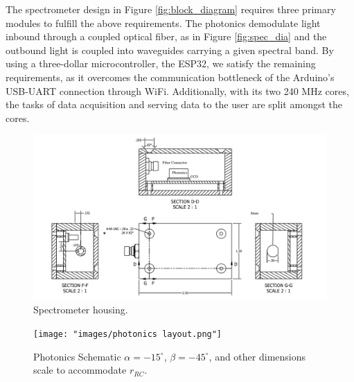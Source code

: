 \documentclass{article}
\begin{document}
      The spectrometer design in Figure \ref{fig:block_diagram} requires three primary modules to fulfill the above requirements. The photonics demodulate light inbound through a coupled optical fiber, as in Figure \ref{fig:spec_dia} and the outbound light is coupled into waveguides carrying a given spectral band. By using a three-dollar microcontroller, the ESP32, we satisfy the remaining requirements, as it overcomes the communication bottleneck of the Arduino's USB-UART connection through WiFi. Additionally, with its two 240 MHz cores, the tasks of data acquisition and serving data to the user are split amongst the cores.
    
    \begin{figure}[H]
    \centering
    \scriptsize  
    \def\svgwidth{\columnwidth}
    \includegraphics{images/proposal_physical.png}
    \caption{\label{fig:physical}Spectrometer housing.}
    \end{figure}
    
    \begin{figure}[H]
    \centering
    \large
    \def\svgwidth{\columnwidth}
    \texttt{[image: "images/photonics layout.png"]}
    \caption{\label{fig:slablayout}Photonics Schematic $\alpha = -15^{\circ}$, $\beta = -45^{\circ}$, and other dimensions scale to accommodate $r_{RC}$.}
    \end{figure}


  
    
\end{document}
